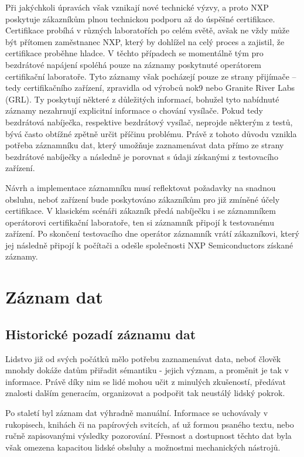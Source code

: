 Při jakýchkoli úpravách však vznikají nové technické výzvy, a proto NXP poskytuje zákazníkům plnou technickou podporu až do úspěšné certifikace. Certifikace probíhá v různých laboratořích po celém světě, avšak ne vždy může být přítomen zaměstnanec NXP, který by dohlížel na celý proces a zajistil, že certifikace proběhne hladce. V těchto případech se momentálně tým pro bezdrátové napájení spoléhá pouze na záznamy poskytnuté operátorem certifikační laboratoře. Tyto záznamy však pocházejí pouze ze strany přijímače – tedy certifikačního zařízení, zpravidla od výrobců nok9 nebo Granite River Labs (GRL). Ty poskytují některé z důležitých informací, bohužel tyto nabídnuté záznamy nezahrnují explicitní informace o chování vysílače. Pokud tedy bezdrátová nabíječka, respektive bezdrátový vysílač, neprojde některým z testů, bývá často obtížné zpětně určit příčinu problému. Právě z tohoto důvodu vznikla potřeba záznamníku dat, který umožňuje zaznamenávat data přímo ze strany bezdrátové nabíječky a následně je porovnat s údaji získanými z testovacího zařízení. \cite{nxp_wireless_charging_team}

Návrh a implementace záznamníku musí reflektovat požadavky na snadnou obsluhu, neboť zařízení bude poskytováno zákazníkům pro již zmíněné účely certifikace. V klasickém scénáři zákazník předá nabíječku i se záznamníkem operátorovi certifikační laboratoře, ten si záznamník připojí k testovanému zařízení. Po skončení testovacího dne operátor záznamník vrátí zákazníkovi, který jej následně připojí k počítači a odešle společnosti NXP Semiconductors získané záznamy.


\chapter{Záznam dat}
\label{zaznam_dat}

\section{Historické pozadí záznamu dat}
\label{pocatky}
Lidstvo již od svých počátků mělo potřebu zaznamenávat data, neboť člověk mnohdy dokáže datům přiřadit sémantiku - jejich význam, a proměnit je tak v informace. Právě díky nim se lidé mohou učit z minulých zkušeností, předávat znalosti dalším generacím, organizovat a podpořit tak neustálý lidský pokrok. 

Po staletí byl záznam dat výhradně manuální. Informace se uchovávaly v rukopisech, knihách či na papírových svitcích, ať už formou psaného textu, nebo ručně zapisovanými výsledky pozorování. Přesnost a dostupnost těchto dat byla však omezena kapacitou lidské obsluhy a možnostmi mechanických nástrojů.


